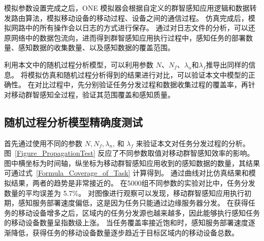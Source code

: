 模拟参数设置完成之后，ONE 模拟器会根据自定义的群智感知应用逻辑和数据转发路由算法，模拟移动设备的移动过程、设备之间的通信过程。
仿真完成后，模拟网路中的所有操作会以日志的方式进行保存。
通过对日志文件的分析，可以还原网络中的数据包流向，进而得到群智感知应用执行过程中，感知任务的部署数量、感知数据的收集数量、以及感知数据的覆盖范围。



利用本文中的随机过程分析模型，可以利用参数 $N$、$N_f$、$\lambda_n$和$\lambda_f$推导出同样的信息。
将模拟仿真和随机过程分析得到的结果进行对比，可以验证本文中模型的正确性。
在对比过程中，先分别验证任务分发过程和数据收集过程的覆盖率，再针对移动群智感知全过程，验证其范围覆盖和感知质量。


\subsection{随机过程分析模型精确度测试}

首先通过使用不同的参数 $N, N_f, \lambda_n$, 和 $\lambda_f$ 来验证本文对任务分发过程的分析。
图~\ref{Figure_PropagationTest} 反应了不同参数取值对移动群智感知效率的影响。
图中横坐标为时间轴，纵坐标为移动群智感知应用收到的感知数据的数量，其结果可通过式~\eqref{Formula_Coverage_of_Task} 计算得到。
通过曲线对比仿真结果和模拟结果，两者的趋势是非常接近的。
在5000组不同参数的实验对比中，任务分发数量的平均误差为 5.7\%。
对图像进行观察可以发现，移动群智感知应用执行初期，感知服务部署速度偏低，这是因为任务只能通过边缘服务器分发。
在获得任务的移动设备增多之后，区域内的任务分发源也越来越多，因此能够执行感知任务的移动设备数量呈指数级上涨。
当任务覆盖率接近饱和时，感知服务部署速度逐渐降低，获得任务的移动设备数量逐步趋近于目标区域内的移动设备总数。

